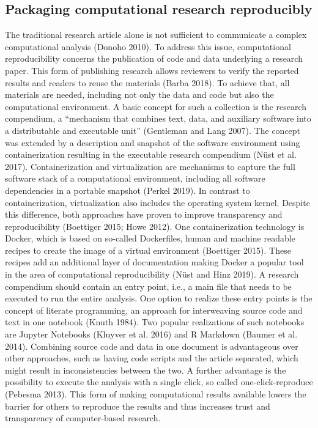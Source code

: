 \documentclass[onecolumn]{article}
\begin{document}
\hypertarget{packaging-computational-research-reproducibly}{%
\subsection{Packaging computational research
reproducibly}\label{packaging-computational-research-reproducibly}}

The traditional research article alone is not sufficient to communicate
a complex computational analysis (Donoho 2010). To address this issue,
computational reproducibility concerns the publication of code and data
underlying a research paper. This form of publishing research allows
reviewers to verify the reported results and readers to reuse the
materials (Barba 2018). To achieve that, all materials are needed,
including not only the data and code but also the computational
environment. A basic concept for such a collection is the research
compendium, a ``mechanism that combines text, data, and auxiliary
software into a distributable and executable unit'' (Gentleman and Lang
2007). The concept was extended by a description and snapshot of the
software environment using containerization resulting in the executable
research compendium (Nüst et al. 2017). Containerization and
virtualization are mechanisms to capture the full software stack of a
computational environment, including all software dependencies in a
portable snapshot (Perkel 2019). In contrast to containerization,
virtualization also includes the operating system kernel. Despite this
difference, both approaches have proven to improve transparency and
reproducibility (Boettiger 2015; Howe 2012). One containerization
technology is Docker, which is based on so-called Dockerfiles, human and
machine readable recipes to create the image of a virtual environment
(Boettiger 2015). These recipes add an additional layer of documentation
making Docker a popular tool in the area of computational
reproducibility (Nüst and Hinz 2019). A research compendium should
contain an entry point, i.e., a main file that needs to be executed to
run the entire analysis. One option to realize these entry points is the
concept of literate programming, an approach for interweaving source
code and text in one notebook (Knuth 1984). Two popular realizations of
such notebooks are Jupyter Notebooks (Kluyver et al. 2016) and R
Markdown (Baumer et al. 2014). Combining source code and data in one
document is advantageous over other approaches, such as having code
scripts and the article separated, which might result in inconsistencies
between the two. A further advantage is the possibility to execute the
analysis with a single click, so called one-click-reproduce (Pebesma
2013). This form of making computational results available lowers the
barrier for others to reproduce the results and thus increases trust and
transparency of computer-based research.
\end{document}
